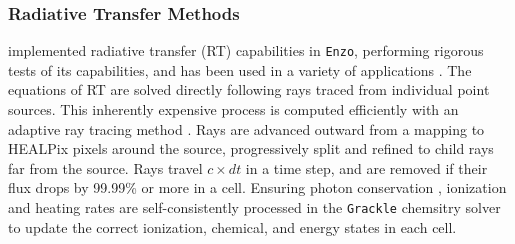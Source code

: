 \documentclass[11pt]{article}
\begin{document}
\subsubsection{Radiative Transfer Methods}


\cite{WiseAbel2011} implemented radiative transfer (RT) capabilities in \texttt{Enzo}, performing rigorous tests of its capabilities, and has been used in a variety of applications \citep[e.g.][]{WiseAbel2012,Wise2012a,Wise2014, Smith2015, OShea2015, Koh2016, Regan2016a, Regan2016b}. The equations of RT are solved directly following rays traced from individual point sources. This inherently expensive process is computed efficiently with an adaptive ray tracing method \citep{AbelWandelt2002}. Rays are advanced outward from a mapping to HEALPix pixels around the source, progressively split and refined to child rays far from the source. Rays travel $c\times dt$ in a time step, and are removed if their flux drops by 99.99\% or more in a cell. Ensuring photon conservation \citep{Abel1999,Mellema2006}, ionization and heating rates are self-consistently processed in the \texttt{Grackle} chemsitry solver to update the correct ionization, chemical, and energy states in each cell.
\end{document}
